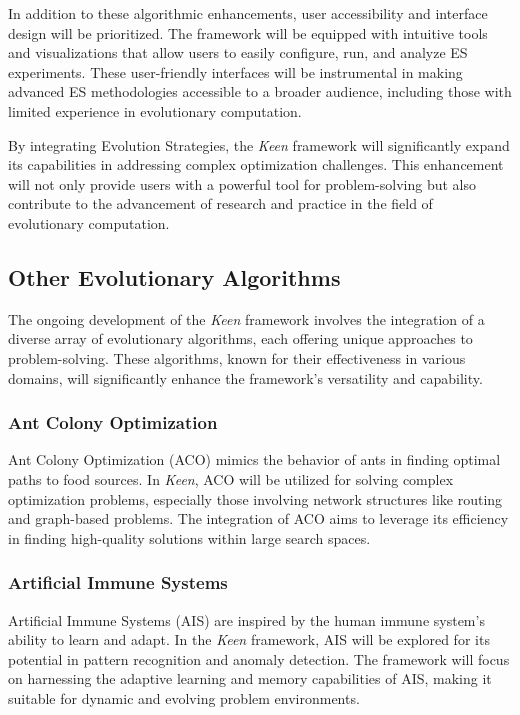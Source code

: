         In addition to these algorithmic enhancements, user accessibility and interface design will be prioritized. The 
        framework will be equipped with intuitive tools and visualizations that allow users to easily configure, run, 
        and analyze ES experiments. These user-friendly interfaces will be instrumental in making advanced ES 
        methodologies accessible to a broader audience, including those with limited experience in evolutionary 
        computation.

        By integrating Evolution Strategies, the \textit{Keen} framework will significantly expand its capabilities in 
        addressing complex optimization challenges. This enhancement will not only provide users with a powerful tool 
        for problem-solving but also contribute to the advancement of research and practice in the field of evolutionary 
        computation.

    \subsection{Other Evolutionary Algorithms}
    \label{sec:future:other}
        The ongoing development of the \textit{Keen} framework involves the integration of a diverse array of 
        evolutionary algorithms, each offering unique approaches to problem-solving. These algorithms, known for their 
        effectiveness in various domains, will significantly enhance the framework's versatility and capability.

        \subsubsection{Ant Colony Optimization}
            Ant Colony Optimization (ACO) mimics the behavior of ants in finding optimal paths to food sources. In 
            \textit{Keen}, ACO will be utilized for solving complex optimization problems, especially those involving 
            network structures like routing and graph-based problems. The integration of ACO aims to leverage its 
            efficiency in finding high-quality solutions within large search spaces.

        \subsubsection{Artificial Immune Systems}
            Artificial Immune Systems (AIS) are inspired by the human immune system's ability to learn and adapt. In the 
            \textit{Keen} framework, AIS will be explored for its potential in pattern recognition and anomaly 
            detection. The framework will focus on harnessing the adaptive learning and memory capabilities of AIS, 
            making it suitable for dynamic and evolving problem environments.

